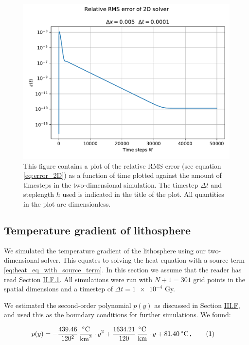 \documentclass[reprint,english,notitlepage]{revtex4-1}  %
\newcommand\numberthis{\addtocounter{equation}{1}\tag{\theequation}}
\begin{document}
\begin{figure}[H]
\centering
\includegraphics[width=\columnwidth]{../data/2Derr.pdf}
\caption{This figure contains a plot of the relative RMS error (see equation \eqref{eq:error_2D}) as a function of time plotted against the amount of timesteps in the two-dimensional simulation. The timestep $\Delta t$ and steplength $h$ used is indicated in the title of the plot. All quantities in the plot are dimensionless.} \label{fig:error_2D}
\end{figure}

\subsection{Temperature gradient of lithosphere} \label{sec:results_lithosphere}

We simulated the temperature gradient of the lithosphere using our two-dimensional solver. This equates to solving the heat equation with a source term \eqref{eq:heat_eq_with_source_term}. In this section we assume that the reader has read Section \hyperref[sec:formalism_heat_source_model]{II.F.1}. All simulations were run with $N+1 = 301$ grid points in the spatial dimensions and a timestep of $\Delta t = \num{1e-4}$ Gy. 

We estimated the second-order polynomial $p(y)$ as discussed in Section \hyperref[sec:method_heat_sim]{III.F}, and used this as the boundary conditions for further simulations. We found:

\begin{align*}
p(y) &= -\frac{439.46}{120^2} \, \frac{^\circ\text{C}}{\text{km}^2} \cdot y^2 + \frac{1634.21}{120} \, \frac{^\circ\text{C}}{\text{km}} \cdot y + 81.40 \, ^\circ\text{C} \, , \numberthis \label{eq:lithosphere_boundary_estimate}
\end{align*}
\end{document}
